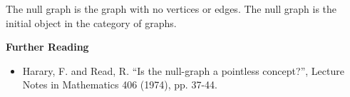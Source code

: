 \documentclass[12pt]{article}
\begin{document}
The null graph is the graph with no vertices or edges.  The null graph is the initial object in the category of graphs.

{\bf Further Reading}
\begin{itemize}
\item Harary, F. and Read, R.  ``Is the null-graph a pointless concept?'', Lecture Notes in Mathematics 406 (1974), pp. 37-44.
\end{itemize}
\end{document}
